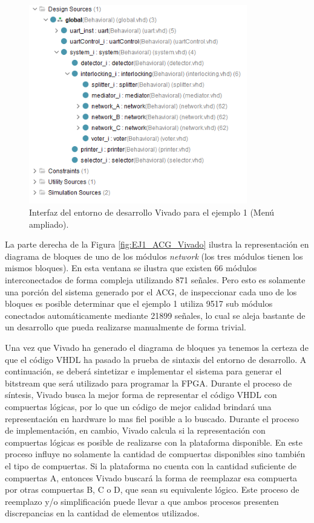 	\begin{figure}[H]
		\centering
		\includegraphics[origin = c, width=0.85\textwidth]{resultados-obtenidos/ejemplo1/images/ACG_vivado_2}
		\centering\caption{Interfaz del entorno de desarrollo Vivado para el ejemplo 1 (Menú ampliado).}
		\label{fig:EJ1_ACG_Vivado_ampliado}
	\end{figure}
	
	La parte derecha de la Figura \ref{fig:EJ1_ACG_Vivado} ilustra la representación en diagrama de bloques de uno de los módulos \textit{network} (los tres módulos tienen los mismos bloques). En esta ventana se ilustra que existen 66 módulos interconectados de forma compleja utilizando 871 señales. Pero esto es solamente una porción del sistema generado por el ACG, de inspeccionar cada uno de los bloques es posible determinar que el ejemplo 1 utiliza 9517 sub módulos conectados automáticamente mediante 21899 señales, lo cual se aleja bastante de un desarrollo que pueda realizarse manualmente de forma trivial.
	
	Una vez que Vivado ha generado el diagrama de bloques ya tenemos la certeza de que el código VHDL ha pasado la prueba de sintaxis del entorno de desarrollo. A continuación, se deberá sintetizar e implementar el sistema para generar el bitstream que será utilizado para programar la FPGA. Durante el proceso de síntesis, Vivado busca la mejor forma de representar el código VHDL con compuertas lógicas, por lo que un código de mejor calidad brindará una representación en hardware lo mas fiel posible a lo buscado. Durante el proceso de implementación, en cambio, Vivado calcula si la representación con compuertas lógicas es posible de realizarse con la plataforma disponible. En este proceso influye no solamente la cantidad de compuertas disponibles sino también el tipo de compuertas. Si la plataforma no cuenta con la cantidad suficiente de compuertas A, entonces Vivado buscará la forma de reemplazar esa compuerta por otras compuertas B, C o D, que sean su equivalente lógico. Este proceso de reemplazo y/o simplificación puede llevar a que ambos procesos presenten discrepancias en la cantidad de elementos utilizados. 
	
